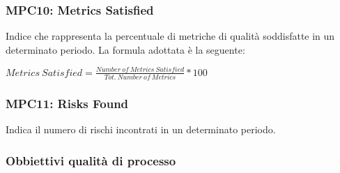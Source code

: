 \subsubsection{MPC10: Metrics Satisfied}\label{sssec:metrics_satisfied}
Indice che rappresenta la percentuale di metriche di qualità soddisfatte in un determinato periodo.
La formula adottata è la seguente:
\begin{center}
    $Metrics\ Satisfied = \displaystyle \frac{Number\ of\ Metrics\ Satisfied}{Tot.\ Number\ of\ Metrics}*100$
\end{center}

\subsubsection{MPC11: Risks Found}\label{sssec:risks_found}
Indica il numero di rischi incontrati in un determinato periodo.
\subsubsection{Obbiettivi qualità di processo}
        \renewcommand{\arraystretch}{1.8}

